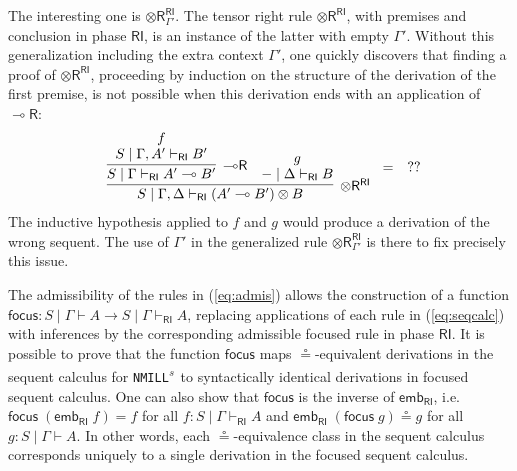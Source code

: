\documentclass[copyright,creativecommons]{eptcs}
\theoremstyle{definition}
\newcommand{\tr}{\otimes \mathsf{R}}
\newcommand{\lright}{{\multimap}\mathsf{R}}
\newcommand{\ot}{\otimes}
\newcommand{\lolli}{\multimap}
\newcommand{\RI}{\mathsf{RI}}
\newcommand{\proofbox}[1]{\begin{tabular}{l} #1 \end{tabular}}
\newcommand{\NMILL}{\texttt{NMILL}}
\newcommand{\SkNMILL}{\NMILL\textsuperscript{\textit{s}}}
\begin{document}
The interesting one is $\tr_{\Gamma'}^{\RI}$. The tensor right rule $\tr^\RI$, with premises and conclusion in phase $\RI$, is an instance of the latter with empty $\Gamma'$. 
Without this generalization including the extra context $\Gamma'$, one quickly discovers that finding a proof of $\tr^\RI$, proceeding by induction on the structure of the derivation of the first premise, is not possible when this derivation ends with an application of $\lright$:
\vspace{-.3cm}
\begin{displaymath}
  \proofbox{
    \infer[\tr^{\RI}]{S \mid \Gamma , \Delta \vdash_{\RI} (A' \lolli B') \ot B}{
    \infer[\lright]{S \mid \Gamma \vdash_{\RI} A' \lolli B'}{
      \deduce{S \mid \Gamma , A' \vdash_{\RI} B'}{f}
    }
    &
    \deduce{{-} \mid \Delta \vdash_{\RI} B}{g}
    }
    } = \quad ??
\end{displaymath}
The inductive hypothesis applied to $f$ and $g$ would produce a derivation of the wrong sequent. The use of $\Gamma'$ in the generalized rule $\tr_{\Gamma'}^{\RI}$ is there to fix precisely this issue.

The admissibility of the rules in (\ref{eq:admis}) allows the construction of a function $\mathsf{focus} : S \mid \Gamma \vdash A \to S \mid \Gamma \vdash_\RI A$, replacing applications of each rule in (\ref{eq:seqcalc}) with inferences by the corresponding admissible focused rule in phase $\RI$.
It is possible to prove that the function $\mathsf{focus}$ maps  $\circeq$-equivalent derivations in the sequent calculus for \SkNMILL\ to syntactically identical derivations in focused sequent calculus. One can also show that $\mathsf{focus}$ is the inverse of $\mathsf{emb}_\RI$, i.e. $\mathsf{focus}\;(\mathsf{emb}_\RI \;f) = f$ for all $f : S \mid \Gamma \vdash_\RI A$ and $\mathsf{emb}_\RI\;(\mathsf{focus}\;g) \circeq g$ for all $g : S \mid \Gamma \vdash A$. In other words, each $\circeq$-equivalence class in the sequent calculus corresponds uniquely to a single derivation in the focused sequent calculus.
\end{document}
